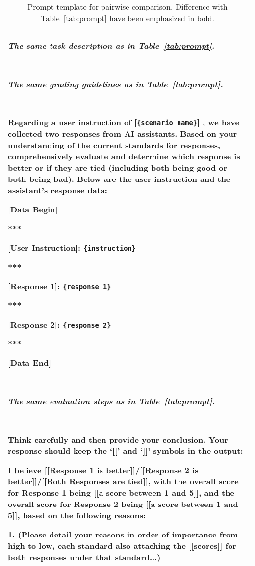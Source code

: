 \begin{table*}[tbh!]
  \caption{Prompt template for pairwise comparison. Difference with Table~\ref{tab:prompt} have been emphasized in bold.}
  \label{tab:prompt-pairwise}
  \small
  \begin{tabularx}{\textwidth}{X}
    \toprule
        \emph{The same task description as in Table~\ref{tab:prompt}.}

        \ 
        
        \emph{The same grading guidelines as in Table~\ref{tab:prompt}.}
        
        \
        
        Regarding a user instruction of [\texttt{\{scenario name\}}] , we have collected \textbf{two responses from AI assistants. Based on your understanding of the current standards for responses, comprehensively evaluate and determine which response is better or if they are tied (including both being good or both being bad).} Below are the user instruction and the assistant's response data: 
        
        [Data Begin] 
        
        ***
        
        [User Instruction]: \texttt{\{instruction\}} 
        
        *** 
        
        \textbf{[Response 1]: \texttt{\{response 1\}}}
        
        ***

        \textbf{[Response 2]: \texttt{\{response 2\}}}

        ***
        
        [Data End] 

        \
        
        \emph{The same evaluation steps as in Table~\ref{tab:prompt}.}

        \ 
        
        Think carefully and then provide your conclusion. Your response should keep the `[[' and `]]' symbols in the output: 
        
        I believe \textbf{[[Response 1 is better]]/[[Response 2 is better]]/[[Both Responses are tied]], with the overall score for Response 1 being [[a score between 1 and 5]], and the overall score for Response 2 being [[a score between 1 and 5]], based on the following reasons:}
        
        \textbf{1. (Please detail your reasons in order of importance from high to low, each standard also attaching the [[scores]] for both responses under that standard...)}   \\
    \bottomrule
  \end{tabularx}
\end{table*}






